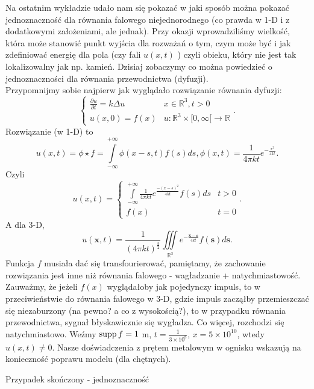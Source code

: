 \documentclass[../main.tex]{subfiles}
\begin{document}
Na ostatnim wykładzie udało nam się pokazać w jaki sposób można pokazać jednoznaczność dla równania falowego niejednorodnego (co prawda w 1-D i z dodatkowymi założeniami, ale jednak). Przy okazji wprowadziliśmy wielkość, która może stanowić punkt wyjścia dla rozważań o tym, czym może być i jak zdefiniować energię dla pola (czy fali $u(x,t)$ ) czyli obieku, który nie jest tak lokalizowalny jak np. kamień. Dzisiaj zobaczymy co można powiedzieć o jednoznaczności dla równania przewodnictwa (dyfuzji).\\
Przypomnijmy sobie najpierw jak wyglądało rozwiązanie równania dyfuzji:
\[
\begin{cases}
		\frac{\partial u}{\partial t} = k \Delta u & x\in \mathbb{R}^3, t>0\\
		u(x,0) = f(x)& u: \mathbb{R}^3\times[0,\infty[\to \mathbb{R}
\end{cases}
.\]
Rozwiązanie (w 1-D) to
\[
		u(x,t) = \phi \star f = \int\limits_{-\infty}^{+\infty}\phi(x-s,t)f(s)d s, \phi(x,t) = \frac{1}{4\pi k t}e^{-\frac{x^2}{4 k t}}
.\]
Czyli
\[
		u(x,t) = \begin{cases}
				\int\limits_{-\infty}^{+\infty}\frac{1}{4\pi kt}e^{\frac{-(x-s)^2}{4kt}}f(s)d s& t>0\\
				f(x)& t = 0
		\end{cases}
.\]
A dla 3-D,
\[
		u(\mathbf{x}, t) = \frac{1}{\left( 4\pi kt \right) ^{\frac{3}{2}}}\iiint\limits_{\mathbb{R}^3} e^{-\frac{\mathbf{x} - \mathbf{s}}{4kt}} f(\mathbf{s})d\mathbf{s}
.\]
Funkcja $f$ musiała dać się transfourierować, pamiętamy, że zachowanie rozwiązania jest inne niż równania falowego - wagładzanie + natychmiastowość.\\
Zauważmy, że jeżeli $f(x)$ wyglądałoby jak pojedynczy impuls, to w przeciwieństwie do równania falowego w 3-D, gdzie impuls zacząłby przemieszczać się niezaburzony (na pewno? a co z wysokością?), to w przypadku równania przewodnictwa, sygnał błyskawicznie się wygładza. Co więcej, rozchodzi się natychmiastowo. Weźmy $\operatorname{supp} f = 1$ m, $t = \frac{1}{3\times 10^8}$, $x = 5\times 10^10$, wtedy $u(x,t) \neq 0$. Nasze doświadczenia z prętem metalowym w ognisku wskazują na konieczność poprawu modelu (dla chętnych).\\
\begin{tw}
		Przypadek skończony - jednoznaczność
\end{tw}
\end{document}
